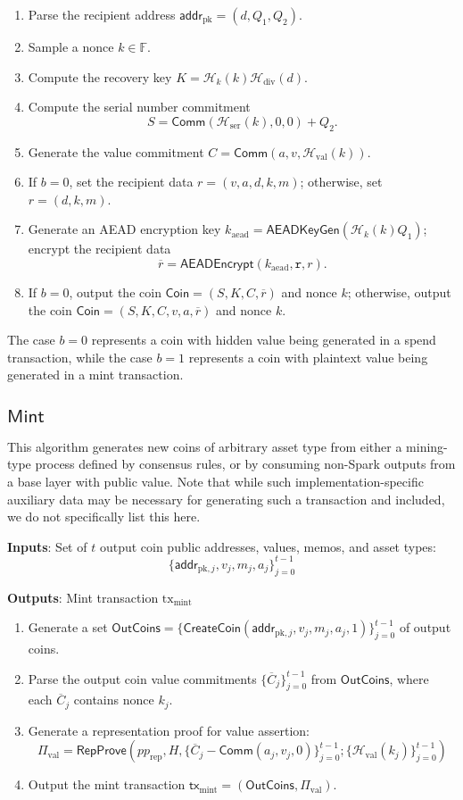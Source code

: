 \documentclass{article}
\newcommand{\F}{\mathbb{F}}
\newcommand{\func}[1]{\mathsf{#1}}
\newcommand{\addr}{\func{addr}}
\newcommand{\comm}{\func{Comm}}
\newcommand{\hash}{\mathcal{H}}
\begin{document}
\begin{enumerate}
\item Parse the recipient address $\addr_{\text{pk}} = (d, Q_1, Q_2)$.
\item Sample a nonce $k \in \F$.
\item Compute the recovery key $K = \hash_k(k)\hash_{\text{div}}(d)$.
\item Compute the serial number commitment $$S = \comm(\hash_{\text{ser}}(k), 0, 0) + Q_2.$$
\item Generate the value commitment $C = \comm(a, v, \hash_{\text{val}}(k))$.
\item If $b = 0$, set the recipient data $r = (v,a,d,k,m)$; otherwise, set $r = (d,k,m)$.
\item Generate an AEAD encryption key $k_{\text{aead}} = \func{AEADKeyGen}(\hash_k(k)Q_1)$; encrypt the recipient data $$\overline{r} = \func{AEADEncrypt}(k_{\text{aead}},\texttt{r},r).$$
\item If $b=0$, output the coin $\func{Coin} = (S, K, C, \overline{r})$ and nonce $k$; otherwise, output the coin $\func{Coin} = (S, K, C, v, a, \overline{r})$ and nonce $k$.
\end{enumerate}
The case $b=0$ represents a coin with hidden value being generated in a spend transaction, while the case $b=1$ represents a coin with plaintext value being generated in a mint transaction.


\subsection{\texorpdfstring{$\func{Mint}$}{Mint}}

This algorithm generates new coins of arbitrary asset type from either a mining-type process defined by consensus rules, or by consuming non-Spark outputs from a base layer with public value.
Note that while such implementation-specific auxiliary data may be necessary for generating such a transaction and included, we do not specifically list this here.

\textbf{Inputs}: Set of $t$ output coin public addresses, values, memos, and asset types: $$\{\addr_{\text{pk},j}, v_j, m_j, a_j\}_{j=0}^{t-1}$$

\textbf{Outputs}: Mint transaction $\text{tx}_{\text{mint}}$

\begin{enumerate}
    \item Generate a set $\func{OutCoins} = \{\func{CreateCoin}(\addr_{\text{pk},j}, v_j, m_j, a_j, 1)\}_{j=0}^{t-1}$ of output coins.
    \item Parse the output coin value commitments $\{\overline{C}_j\}_{j=0}^{t-1}$ from $\func{OutCoins}$, where each $\overline{C}_j$ contains nonce $k_j$.
    \item Generate a representation proof for value assertion: $$\Pi_{\text{val}} = \func{RepProve}\left( pp_{\text{rep}}, H, \{ \overline{C}_j - \comm(a_j, v_j, 0) \}_{j=0}^{t-1}; \{\hash_{\text{val}}(k_j)\}_{j=0}^{t-1} \right)$$
    \item Output the mint transaction $\func{tx}_{\text{mint}} = (\func{OutCoins}, \Pi_{\text{val}})$.
\end{enumerate}
\end{document}
